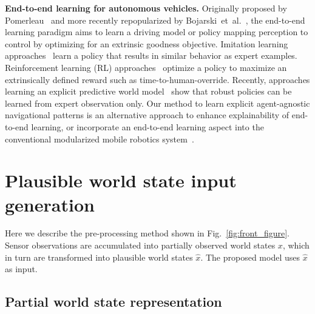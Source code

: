 \documentclass[letterpaper, 10 pt, conference]{ieeeconf}
\begin{document}
\noindent \textbf{End-to-end learning for autonomous vehicles.}
Originally proposed by Pomerleau~\cite{pomerleau1988alvinn} and more recently repopularized by Bojarski~et~al.~\cite{bojarski2016e2e_self_driving}, the end-to-end learning paradigm aims to learn a driving model or policy mapping perception to control by optimizing for an extrinsic goodness objective.
Imitation learning approaches~\cite{bojarski2016e2e_self_driving, amin2018variational_end2end, bansal2018} learn a policy that results in similar behavior as expert examples.
Reinforcement learning (RL) approaches~\cite{kendall2019end2end_deeprl} optimize a policy to maximize an extrinsically defined reward such as time-to-human-override.
Recently, approaches learning an explicit predictive world model~\cite{henaff2019model_predictive_policy_learning, chen2021world_on_rails} show that robust policies can be learned from expert observation only.
Our method to learn explicit agent-agnostic navigational patterns is an alternative approach to enhance explainability of end-to-end learning, or incorporate an end-to-end learning aspect into the conventional modularized mobile robotics system~\cite{krause2013robot_navigation}.












\section{Plausible world state input generation}
\label{sec:plausible_world_state_input_generation}

Here we describe the pre-processing method shown in Fig.~\ref{fig:front_figure}. Sensor observations are accumulated into partially observed world states $x$, which in turn are transformed into plausible world states $\hat{x}$. The proposed model
uses $\hat{x}$ as input.

\subsection{Partial world state representation}
\label{sec:partial_world_state_representation}
\end{document}
